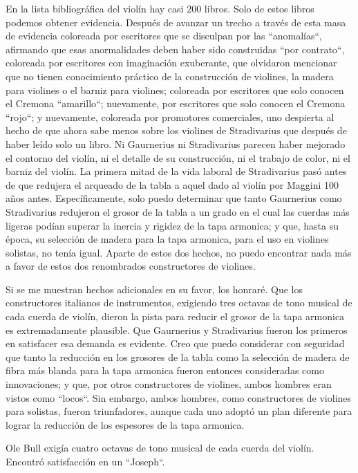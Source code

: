 \documentclass[12pt]{book}
\begin{document}
En la lista bibliográfica del violín hay casi 200 libros. Solo de estos libros podemos obtener evidencia. Después de avanzar un trecho a través de esta masa de evidencia coloreada por escritores que se disculpan por las ``anomalías``, afirmando que esas anormalidades deben haber sido construidas ``por contrato``, coloreada por escritores con imaginación exuberante, que olvidaron mencionar que no tienen conocimiento práctico de la construcción de violines, la madera para violines o el barniz para violines; coloreada por escritores que solo conocen el Cremona ``amarillo``; nuevamente, por escritores que solo conocen el Cremona ``rojo``; y nuevamente, coloreada por promotores comerciales, uno despierta al hecho de que ahora sabe menos sobre los violines de Stradivarius que después de haber leído solo un libro.
Ni Gaurnerius ni Stradivarius parecen haber mejorado el contorno del violín, ni el detalle de su construcción, ni el trabajo de color, ni el barniz del violín. La primera mitad de la vida laboral de Stradivarius pasó antes de que redujera el arqueado de la tabla a aquel dado al violín por Maggini 100 años antes. Específicamente, solo puedo determinar que tanto Gaurnerius como Stradivarius redujeron el grosor de la tabla a un grado en el cual las cuerdas más ligeras podían superar la inercia y rigidez de la tapa armonica; y que, hasta su época, su selección de madera para la tapa armonica, para el uso en violines solistas, no tenía igual. Aparte de estos dos hechos, no puedo encontrar nada más a favor de estos dos renombrados constructores de violines.

Si se me muestran hechos adicionales en su favor, los honraré. Que los constructores italianos de instrumentos, exigiendo tres octavas de tono musical de cada cuerda de violín, dieron la pista para reducir el grosor de la tapa armonica es extremadamente plausible. Que Gaurnerius y Stradivarius fueron los primeros en satisfacer esa demanda es evidente.
Creo que puedo considerar con seguridad que tanto la reducción en los grosores de la tabla como la selección de madera de fibra más blanda para la tapa armonica fueron entonces consideradas como innovaciones; y que, por otros constructores de violines, ambos hombres eran vistos como ``locos``. Sin embargo, ambos hombres, como constructores de violines para solistas, fueron triunfadores, aunque cada uno adoptó un plan diferente para lograr la reducción de los espesores de la tapa armonica.

Ole Bull exigía cuatro octavas de tono musical de cada cuerda del violín. Encontró satisfacción en un ``Joseph``.
\end{document}
